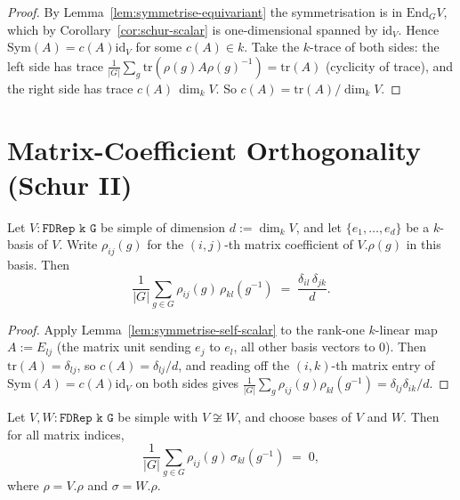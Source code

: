 \begin{proof}
  By Lemma~\ref{lem:symmetrise-equivariant} the symmetrisation is in
  $\mathrm{End}_G V$, which by Corollary~\ref{cor:schur-scalar} is one-dimensional
  spanned by $\mathrm{id}_V$. Hence $\mathrm{Sym}(A) = c(A)\mathrm{id}_V$ for some
  $c(A) \in k$. Take the $k$-trace of both sides: the left side has trace
  $\frac{1}{|G|}\sum_g \mathrm{tr}(\rho(g) A \rho(g)^{-1}) = \mathrm{tr}(A)$
  (cyclicity of trace), and the right side has trace $c(A)\,\dim_k V$.
  So $c(A) = \mathrm{tr}(A)/\dim_k V$.
\end{proof}

\section{Matrix-Coefficient Orthogonality (Schur II)}

\begin{theorem}
  \label{thm:matrix-coeff-ortho-self}
  Let $V : \texttt{FDRep k G}$ be simple of dimension $d := \dim_k V$, and let
  $\{e_1, \ldots, e_d\}$ be a $k$-basis of $V$. Write $\rho_{ij}(g)$ for the
  $(i,j)$-th matrix coefficient of $V.\rho(g)$ in this basis. Then
  \[
    \frac{1}{|G|}\sum_{g \in G} \rho_{ij}(g)\, \rho_{kl}(g^{-1})
    \;=\; \frac{\delta_{il}\,\delta_{jk}}{d}.
  \]
\end{theorem}

\begin{proof}
  Apply Lemma~\ref{lem:symmetrise-self-scalar} to the rank-one $k$-linear map
  $A := E_{lj}$ (the matrix unit sending $e_j$ to $e_l$, all other basis
  vectors to $0$). Then $\mathrm{tr}(A) = \delta_{lj}$, so
  $c(A) = \delta_{lj}/d$, and reading off the $(i,k)$-th matrix entry of
  $\mathrm{Sym}(A) = c(A)\mathrm{id}_V$ on both sides gives
  $\frac{1}{|G|}\sum_g \rho_{ij}(g)\rho_{kl}(g^{-1}) = \delta_{lj}\delta_{ik}/d$.
\end{proof}

\begin{theorem}
  \label{thm:matrix-coeff-ortho-distinct}
  Let $V, W : \texttt{FDRep k G}$ be simple with $V \not\cong W$, and choose
  bases of $V$ and $W$. Then for all matrix indices,
  \[
    \frac{1}{|G|}\sum_{g \in G} \rho_{ij}(g)\, \sigma_{kl}(g^{-1}) \;=\; 0,
  \]
  where $\rho = V.\rho$ and $\sigma = W.\rho$.
\end{theorem}

